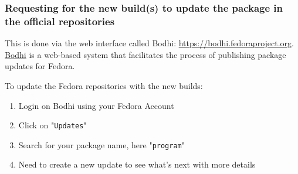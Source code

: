 \newpage
\subsubsection{Requesting for the new build(s) to update the package in the official repositories}

This is done via the web interface called Bodhi: \href{https://bodhi.fedoraproject.org}{https://bodhi.fedoraproject.org}. \\ 
\href{https://fedoraproject.org/wiki/Bodhi}{Bodhi} is a web-based system that facilitates the process of publishing package updates for Fedora. \\
\begin{center}
\end{center}
To update the Fedora repositories with the new builds:
\begin{enumerate}
\item Login on Bodhi using your Fedora Account
\item Click on "\texttt{Updates}" 
\item Search for your package name, here "\texttt{program}" 
\item Need to create a new update to see what's next with more details
\end{enumerate}

\clearpage
